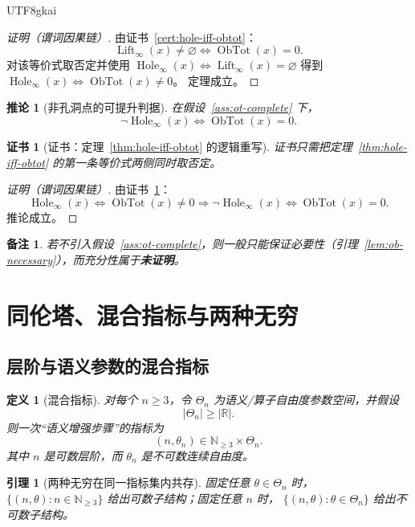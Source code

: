 \documentclass[12pt]{article}
\newtheorem{definition}{定义}[section]
\newtheorem{corollary}{推论}[section]
\newtheorem{lemma}{引理}[section]
\newtheorem{remark}{备注}[section]
\newtheorem{Certificate}{证书}[section]
\newcommand{\ObTot}{\operatorname{ObTot}}
\newcommand{\Hole}{\operatorname{Hole}}
\newcommand{\Lift}{\operatorname{Lift}}
\begin{document}
\begin{CJK*}{UTF8}{gkai}
\begin{proof}[证明（谓词因果链）]
由证书~\ref{cert:hole-iff-obtot}：
\[
\Lift_\infty(x)\neq\varnothing \Longleftrightarrow \ObTot(x)=0.
\]
对该等价式取否定并使用
\(
\Hole_\infty(x)\Longleftrightarrow \Lift_\infty(x)=\varnothing
\)
得到
\(
\Hole_\infty(x)\Longleftrightarrow \ObTot(x)\neq 0
\)。
定理成立。
\end{proof}

\begin{corollary}[非孔洞点的可提升判据]\label{cor:non-hole-lift}
在假设~\ref{ass:ot-complete} 下，
\[
\neg\Hole_\infty(x)\iff \ObTot(x)=0.
\]
\end{corollary}

\begin{Certificate}[证书：定理~\ref{thm:hole-iff-obtot} 的逻辑重写]\label{cert:non-hole-lift}
证书只需把定理~\ref{thm:hole-iff-obtot} 的第一条等价式两侧同时取否定。
\end{Certificate}

\begin{proof}[证明（谓词因果链）]
由证书~\ref{cert:non-hole-lift}：
\[
\Hole_\infty(x)\iff \ObTot(x)\neq 0
\Rightarrow
\neg\Hole_\infty(x)\iff \ObTot(x)=0.
\]
推论成立。
\end{proof}

\begin{remark}
若不引入假设~\ref{ass:ot-complete}，则一般只能保证必要性（引理~\ref{lem:ob-necessary}），而充分性属于\textbf{未证明}。
\end{remark}

\section{同伦塔、混合指标与两种无穷}

\subsection{层阶与语义参数的混合指标}

\begin{definition}[混合指标]\label{def:mixed-index}
对每个 $n\ge3$，令 $\Theta_n$ 为语义/算子自由度参数空间，并假设
\[
|\Theta_n|\ge|\mathbb R|.
\]
则一次“语义增强步骤”的指标为
\[
(n,\theta_n)\in \mathbb N_{\ge3}\times\Theta_n.
\]
其中 $n$ 是可数层阶，而 $\theta_n$ 是不可数连续自由度。
\end{definition}

\begin{lemma}[两种无穷在同一指标集内共存]\label{lem:two-infinities}
固定任意 $\theta\in\Theta_n$ 时，
\(
\{(n,\theta):n\in\mathbb N_{\ge3}\}
\)
给出可数子结构；固定任意 $n$ 时，
\(
\{(n,\theta):\theta\in\Theta_n\}
\)
给出不可数子结构。
\end{lemma}


\end{CJK*}
\end{document}

